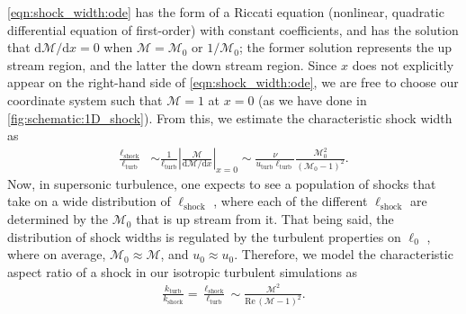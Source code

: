\documentclass[12pt,twoside]{extreport}
\makeatletter
\newcommand{\mdd}[1]{\mathrm{d} #1}
\newcommand{\mReh}{\ensuremath{\mathrm{Re}}} %
\newcommand{\mSonicMach}{\ensuremath{\mathcal{M}}} %
\newcommand{\eg}{e.g.,\xspace} %
\providecommand{\DIFaddtex}[1]{{\protect\color{DIFgreen}\uwave{#1}}} %
\providecommand{\DIFdeltex}[1]{{\protect\color{DIFpurple}\sout{#1}}} %
\providecommand{\DIFaddbegin}{} %
\providecommand{\DIFaddend}{} %
\providecommand{\DIFdelbegin}{} %
\providecommand{\DIFdelend}{} %
\providecommand{\DIFadd}[1]{\texorpdfstring{\DIFaddtex{#1}}{#1}} %
\providecommand{\DIFdel}[1]{\texorpdfstring{\DIFdeltex{#1}}{}} %
\providecommand{\DIFscaledelfig}{0.5}
\newlength{\DIFdelgraphicswidth} %
\newlength{\DIFdelgraphicsheight} %
\providecommand{\DIFaddincludegraphics}[2][]{{\color{DIFgreen}\fbox{\DIFOincludegraphics[#1]{#2}}}} %
\providecommand{\DIFdelincludegraphics}[2][]{%
\sbox{\DIFdelgraphicsbox}{\DIFOincludegraphics[#1]{#2}}%
\settoboxwidth{\DIFdelgraphicswidth}{\DIFdelgraphicsbox} %
\settoboxtotalheight{\DIFdelgraphicsheight}{\DIFdelgraphicsbox} %
\scalebox{\DIFscaledelfig}{%
\parbox[b]{\DIFdelgraphicswidth}{\usebox{\DIFdelgraphicsbox}\\[-\baselineskip] \rule{\DIFdelgraphicswidth}{0em}}\llap{\resizebox{\DIFdelgraphicswidth}{\DIFdelgraphicsheight}{%
\setlength{\unitlength}{\DIFdelgraphicswidth}%
\begin{picture}(1,1)%
\thicklines\linethickness{2pt} %
{\color{DIFpurple}\put(0,0){\framebox(1,1){}}}%
{\color{DIFpurple}\put(0,0){\line( 1,1){1}}}%
{\color{DIFpurple}\put(0,1){\line(1,-1){1}}}%
\end{picture}%
}\hspace*{3pt}}} %
} %
\DeclareRobustCommand{\DIFaddbegin}{\DIFOaddbegin \let\includegraphics\DIFaddincludegraphics} %
\DeclareRobustCommand{\DIFaddend}{\DIFOaddend \let\includegraphics\DIFOincludegraphics} %
\DeclareRobustCommand{\DIFdelbegin}{\DIFOdelbegin \let\includegraphics\DIFdelincludegraphics} %
\DeclareRobustCommand{\DIFdelend}{\DIFOaddend \let\includegraphics\DIFOincludegraphics} %
\let\sout@orig\sout %
\renewcommand{\sout}[1]{\ifmmode\text{\sout@orig{\ensuremath{#1}}}\else\sout@orig{#1}\fi} %
\makeatother
\begin{document}
\autoref{eqn:shock_width:ode} has the form of a Riccati equation (nonlinear, quadratic differential equation of first-order) with constant coefficients, and has the solution that $\mdd \mSonicMach/\mdd x = 0$ when $\mSonicMach = \mSonicMach_0$ or $1/\mSonicMach_0$; the former solution represents the up stream region, and the latter the down stream region. Since $x$ does not explicitly appear on the right-hand side of \autoref{eqn:shock_width:ode}, we are free to choose our coordinate system such that $\mSonicMach = 1$ at $x=0$ (as we have done in \autoref{fig:schematic:1D_shock}). From this, we estimate the characteristic shock width as
\DIFdelbegin %
\DIFdelend \DIFaddbegin \begin{align}
    \frac{\ell_\mathrm{shock}}{\ell_\mathrm{turb}}
        &\sim \frac{1}{\ell_\mathrm{turb}} \left|
                \frac{\mSonicMach}{\mdd\mSonicMach/\mdd x}
            \right|_{x=0}
        \sim \frac{\nu}{u_\mathrm{turb} \ell_\mathrm{turb}} \frac{\mSonicMach_0^2}{(\mSonicMach_0 - 1)^2}
    .
\end{align}\DIFaddend
Now, in supersonic turbulence, one expects to see a population of shocks that take on a wide distribution of $\ell_\mathrm{shock}$ \citep[\eg][]{smith2000distribution, brunt2002interstellar, donzis2012shock, lesaffre2013low, squire2017distribution, Park2019_pops_MHD_shocks, Beattie2020_ansotropic_shocks, Beattie2022_spdf}, where each of the different $\ell_\mathrm{shock}$ are determined by the $\mSonicMach_0$ that is up stream from it. That being said, the distribution of shock widths is regulated by the turbulent properties on \DIFdelbegin \DIFdel{$\ell_0$ }\DIFdelend \DIFaddbegin \DIFadd{$\ell_\mathrm{turb}$ }\DIFaddend \citep{Park2019_pops_MHD_shocks}, where on average, \mbox{$\mSonicMach_0 \approx \mSonicMach$}, and \mbox{\DIFdelbegin \DIFdel{$u_0 \approx u_0$}\DIFdelend \DIFaddbegin \DIFadd{$u_\mathrm{turb} \approx u$}\DIFaddend }. Therefore, we model the characteristic aspect ratio of a shock in our isotropic turbulent simulations as
\DIFdelbegin %
\DIFdelend \DIFaddbegin \begin{align}
    \frac{k_\mathrm{turb}}{k_\mathrm{shock}}
        = \frac{\ell_\mathrm{shock}}{\ell_\mathrm{turb}}
        \sim \frac{\mSonicMach^2}{\mReh\, (\mSonicMach - 1)^2}
    . \label{eqn:shock_width}
\end{align}\DIFaddend
\end{document}
